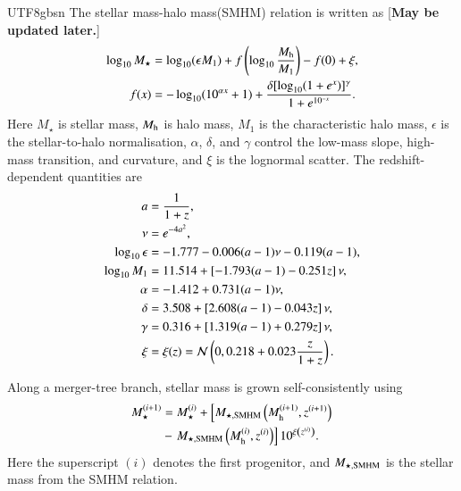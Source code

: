 \documentclass[trackchanges, twocolappendix, twocolumn]{aastex701}
\newcommand{\czkong}[1]{{\color{magenta}[\textbf{#1}]}}
\begin{document}
\begin{CJK*}{UTF8}{gbsn}
The stellar mass-halo mass(SMHM) relation is written as \czkong{May be updated later.}
\begin{align}
\log_{10} M_{\star} & = \log_{10} (\epsilon M_1) + f \left( \log_{10} \dfrac{M_{\rm h}}{M_1} \right) - f(0) + \xi , \\
f (x) & = - \log_{10} (10^{\alpha x} + 1) + \dfrac{\delta [\log_{10} (1 + e^x)]^\gamma}{1 + e^{10^{-x}}} .
\end{align}
Here $M_{\star}$ is stellar mass, $M_{\rm h}$ is halo mass, $M_1$ is the characteristic halo mass, $\epsilon$ is the stellar-to-halo normalisation, $\alpha$, $\delta$, and $\gamma$ control the low-mass slope, high-mass transition, and curvature, and $\xi$ is the lognormal scatter. The redshift-dependent quantities are
\begin{align}
a & = \dfrac{1}{1 + z} , \\
\nu & = e^{- 4 a^2},\\
\log_{10} \epsilon & = - 1.777 - 0.006 (a - 1) \nu -0.119 (a - 1) , \\
\log_{10} M_1 & = 11.514 + \left[ - 1.793 (a - 1) - 0.251 z \right] \nu , \\
\alpha & = -1.412 + 0.731 (a - 1) \nu , \\
\delta
&= 3.508+\left[2.608(a-1)-0.043z\right]\nu,\\
\gamma
&= 0.316+\left[1.319(a-1)+0.279z\right]\nu,\\
\xi & = \xi (z) = {\cal N} \left( 0, 0.218 + 0.023 \dfrac{z}{1 + z} \right) .
\end{align}

Along a merger-tree branch, stellar mass is grown self-consistently using
\begin{align}
M_\star^{(i + 1)} & = M_\star^{(i)} + \left[
M_{\star, {\rm SMHM}} \left( M_{\rm h}^{(i + 1)}, z^{(i + 1)} \right) \notag \right. \\
& - \left. M_{\star, {\rm SMHM}} \left( M_{\rm h}^{(i)}, z^{(i)} \right) \right] 10^{\xi \left( z^{(i)} \right)}.
\end{align}
Here the superscript $(i)$ denotes the first progenitor, and $M_{\star, {\rm SMHM}}$ is the stellar mass from the SMHM relation.


\end{CJK*}
\end{document}
